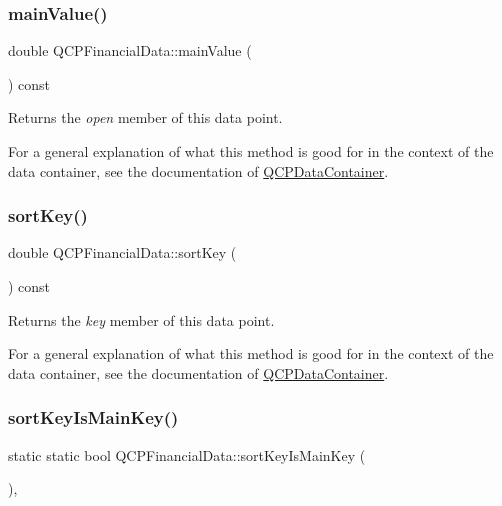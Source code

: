 \subsubsection{\texorpdfstring{mainValue()}{mainValue()}}
{\footnotesize\ttfamily double Q\+C\+P\+Financial\+Data\+::main\+Value (\begin{DoxyParamCaption}{ }\end{DoxyParamCaption}) const\hspace{0.3cm}{\ttfamily [inline]}}

Returns the {\itshape open} member of this data point.

For a general explanation of what this method is good for in the context of the data container, see the documentation of \mbox{\hyperlink{class_q_c_p_data_container}{Q\+C\+P\+Data\+Container}}. \mbox{\label{class_q_c_p_financial_data_ab378e8ef6aef482735aba69115cb442e}} 
\subsubsection{\texorpdfstring{sortKey()}{sortKey()}}
{\footnotesize\ttfamily double Q\+C\+P\+Financial\+Data\+::sort\+Key (\begin{DoxyParamCaption}{ }\end{DoxyParamCaption}) const\hspace{0.3cm}{\ttfamily [inline]}}

Returns the {\itshape key} member of this data point.

For a general explanation of what this method is good for in the context of the data container, see the documentation of \mbox{\hyperlink{class_q_c_p_data_container}{Q\+C\+P\+Data\+Container}}. \mbox{\label{class_q_c_p_financial_data_a1121db9420a7694144f6a99b09257a5f}} 
\subsubsection{\texorpdfstring{sortKeyIsMainKey()}{sortKeyIsMainKey()}}
{\footnotesize\ttfamily static static bool Q\+C\+P\+Financial\+Data\+::sort\+Key\+Is\+Main\+Key (\begin{DoxyParamCaption}{ }\end{DoxyParamCaption})\hspace{0.3cm}{\ttfamily [inline]}, {\ttfamily [static]}}

